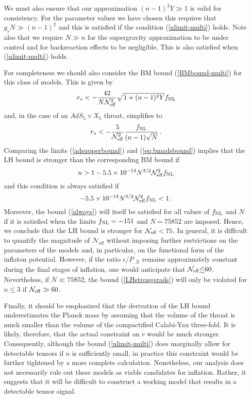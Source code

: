 {We must also ensure that our approximation $(n-1)^2Y \gg 1$ 
is valid for consistency.  
For the parameter values we have chosen this requires that 
$g_s N \gg  (n-1)^2$ 
and this is satisfied if the condition (\ref{nlimit-multi}) 
holds. Note also that we require $N \gg n$ for the supergravity 
approximation to be under control and for backreaction effects to 
be negligible. This is also satisfied when (\ref{nlimit-multi})  
holds. 

For completeness we should also consider the 
BM bound (\ref{BMbound-multi}) for this class of models. This is given by 
\begin{equation}
\label{BMads}
r_* < -\frac{42}{N {\cal{N}}^2_{\rm eff}}\sqrt{1 +(n-1)^2Y}f_{\mathrm{NL}} 
\end{equation} 
and, in the case of an $AdS_5 \times X_5$ throat, simplifies to 
\begin{equation}
\label{eq:bmadsbound}
r_* < -\frac{5}{{\cal{N}}^2_{\rm eff}} 
\frac{f_{\mathrm{NL}}}{(n-1)\sqrt{N}} \,.
\end{equation} 
Comparing the limits (\ref{adsupperbound}) and (\ref{eq:bmadsbound}) 
implies that the LH bound is stronger than the corresponding BM bound if  
\begin{equation}
\label{LHstrongerads}
n > 1 -5.5 \times 10^{-14} N^{3/2} {\cal{N}}_{\rm eff}^2 f_{\mathrm{NL}} 
\end{equation}
and this condition is always satisfied if 
\begin{equation}
\label{always}
-5.5 \times 10^{-14} N^{3/2} {\cal{N}}_{\rm eff}^2 f_{\mathrm{NL}}  <1  \, .
\end{equation}
Moreover, the bound (\ref{always}) will itself be satisfied for 
all values of $f_{\mathrm{NL}}$ and $N$ if it is satisfied when the limits 
$f_{\mathrm{NL}} =-151$ and $N=75852$ are imposed. Hence, we conclude that the LH bound 
is stronger for ${\cal{N}_{\rm eff}} < 75$. 
In general, it is difficult to quantify 
the magnitude of $\mathcal{N}_{\mathrm{eff}}$ without 
imposing further restrictions on the parameters of the models 
and, in particular, on the functional form of the inflaton potential. 
However, if the ratio $\epsilon/P_{,X}$ remains approximately 
constant during the final stages of inflation, one would anticipate that 
${\cal{N}}_{\rm eff} \lsim 60$. Nevertheless, if $N \ll 75852$, the bound 
(\ref{LHstrongerads}) will only be violated for $n \le 3$ if 
${\cal{N}}_{\rm eff} \gg 60$.  

Finally, it should be emphasized that the derivation of the LH bound 
underestimates the Planck mass by assuming that 
the volume of the throat is much smaller 
than the volume of the compactified Calabi-Yau 
three-fold. It is likely, therefore, 
that the actual constraint on $r$ would be much stronger. Consequently, 
although the bound (\ref{nlimit-multi})  
does marginally allow for detectable tensors if $n$ is sufficiently 
small, in practice this constraint would be further tightened by a more 
complete calculation. Nonetheless, our analysis does not necessarily 
rule out these models as viable candidates for inflation. Rather, it  
suggests that it will be difficult to construct a working model 
that results in a detectable tensor signal.   

}
